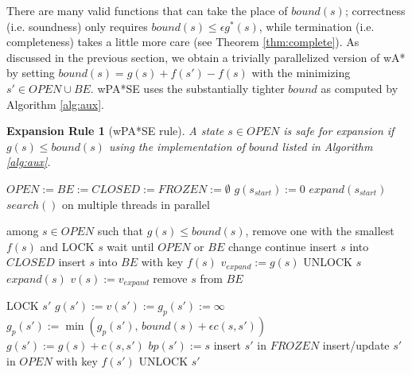 \documentclass[letterpaper]{article}
\newtheorem{rul}{Expansion Rule}
\begin{document}
There are many valid functions that can take the place of $bound(s)$; correctness (i.e. soundness) only requires $bound(s) \le \epsilon g^*(s)$, while termination (i.e. completeness) takes a little more care (see Theorem \ref{thm:complete}). As discussed in the previous section, we obtain a trivially parallelized version of wA* by setting $bound(s) = g(s) + f(s') - f(s)$ with the minimizing $s'\in OPEN \cup BE$. wPA*SE uses the substantially tighter $bound$ as computed by Algorithm \ref{alg:aux}.

\begin{rul}[wPA*SE rule]
A state $s\in OPEN$ is safe for expansion if $g(s) \le bound(s)$ using the implementation of $bound$ listed in Algorithm \ref{alg:aux}.
\end{rul}

\begin{algorithm}
\caption{$main()$}
\label{alg:main}
\begin{algorithmic}
\STATE $OPEN := BE := CLOSED := FROZEN := \emptyset$
\STATE $g(s_{start}) := 0$
\STATE $expand(s_{start})$
\STATE $search()$ on multiple threads in parallel
\end{algorithmic}
\end{algorithm}

\begin{algorithm}
\caption{$search()$}
\label{alg:search}
\begin{algorithmic}
\STATE among $s\in OPEN$ such that $g(s) \le bound(s)$, remove one with the smallest $f(s)$ and LOCK $s$
\STATE wait until $OPEN$ or $BE$ change
\STATE continue
\ENDIF
\STATE insert $s$ into $CLOSED$
\STATE insert $s$ into $BE$ with key $f(s)$
\STATE $v_{expand} := g(s)$
\STATE UNLOCK $s$
\STATE $expand(s)$
\STATE $v(s) := v_{expand}$
\STATE remove $s$ from $BE$
\ENDWHILE
\end{algorithmic}
\end{algorithm}

\begin{algorithm}
\caption{$expand(s)$}
\label{alg:expand}
\begin{algorithmic}
\STATE LOCK $s'$
\STATE $g(s') := v(s') := g_p(s') := \infty$
\ENDIF
\STATE $g_p(s') := \min(g_p(s'),\,bound(s) + \epsilon c(s,s'))$
\STATE $g(s') := g(s) + c(s,s')$
\STATE $bp(s') := s$
\STATE insert $s'$ in $FROZEN$
\ELSE
\STATE insert/update $s'$ in $OPEN$ with key $f(s')$
\ENDIF
\ENDIF
\STATE UNLOCK $s'$
\ENDFOR
\end{algorithmic}
\end{algorithm}
\end{document}
